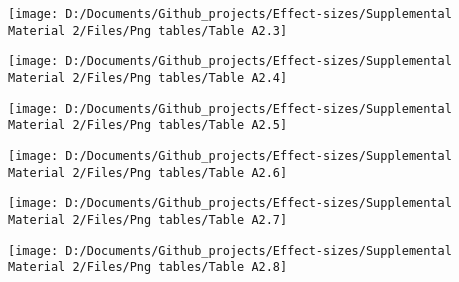 \documentclass[
  english,
  man,mask]{apa6}
\begin{document}
\begin{sidewaysfigure}

{\centering \texttt{[image: D:/Documents/Github\_projects/Effect-sizes/Supplemental Material 2/Files/Png tables/Table A2.3]} 

}

\end{sidewaysfigure}

\begin{sidewaysfigure}

{\centering \texttt{[image: D:/Documents/Github\_projects/Effect-sizes/Supplemental Material 2/Files/Png tables/Table A2.4]} 

}

\end{sidewaysfigure}

\begin{sidewaysfigure}

{\centering \texttt{[image: D:/Documents/Github\_projects/Effect-sizes/Supplemental Material 2/Files/Png tables/Table A2.5]} 

}

\end{sidewaysfigure}

\begin{sidewaysfigure}

{\centering \texttt{[image: D:/Documents/Github\_projects/Effect-sizes/Supplemental Material 2/Files/Png tables/Table A2.6]} 

}

\end{sidewaysfigure}

\begin{sidewaysfigure}

{\centering \texttt{[image: D:/Documents/Github\_projects/Effect-sizes/Supplemental Material 2/Files/Png tables/Table A2.7]} 

}

\end{sidewaysfigure}

\begin{sidewaysfigure}

{\centering \texttt{[image: D:/Documents/Github\_projects/Effect-sizes/Supplemental Material 2/Files/Png tables/Table A2.8]} 

}

\end{sidewaysfigure}
\end{document}

